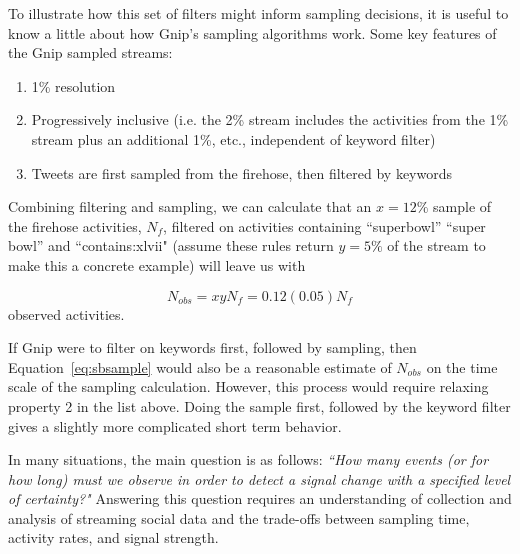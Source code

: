 \documentclass{article}
\begin{document}
To illustrate how this set of filters might inform sampling decisions, it is useful to know a little about how Gnip's sampling algorithms work.  Some key features of the Gnip sampled streams:

\begin{enumerate}
	\item 1\% resolution 
	\item Progressively inclusive (i.e. the 2\% stream includes the activities from the 1\% stream plus an additional 1\%, etc., independent of keyword filter)
	\item Tweets are first sampled from the firehose, then filtered by keywords 
\end{enumerate}

Combining filtering and sampling, we can calculate that an $x=12\%$ sample of the firehose activities, $N_f$, filtered on activities containing ``superbowl'' ``super bowl'' and ``contains:xlvii" (assume these rules return $y=5\%$ of the stream to make this a concrete example) will leave us with


\begin{equation}
    \label{eq:sbsample}
    N_{obs} = x y N_f = 0.12 (0.05) N_f
\end{equation}
observed activities. 

If Gnip were to filter on keywords first, followed by sampling, then Equation~\ref{eq:sbsample} would also be a reasonable estimate of $N_{obs}$ on the time scale of the sampling calculation. However, this process would require relaxing property 2 in the list above. 
Doing the sample first, followed by the keyword filter gives a slightly more complicated short term behavior.


In many situations, the main question is as follows: \emph{``How many events (or for how long) must we observe in order to detect a signal change with a specified level of certainty?"} Answering this question requires an understanding of collection and analysis of streaming social data and the trade-offs between sampling time, activity rates, and signal strength. 
\end{document}

